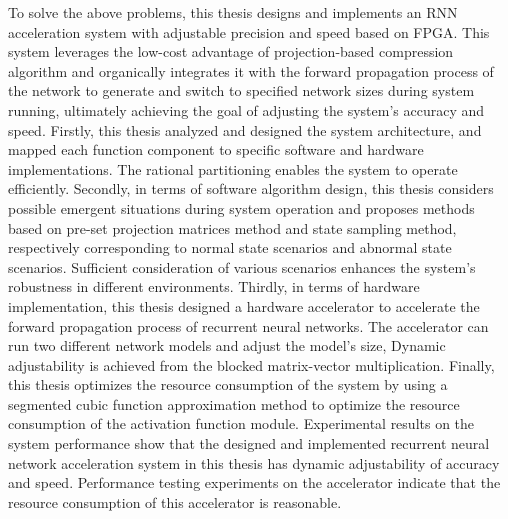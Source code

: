 \begin{englishabstract}
To solve the above problems, this thesis designs and implements an RNN acceleration system with adjustable precision and 
speed based on FPGA. 
This system leverages the low-cost advantage of projection-based compression algorithm and organically integrates it with 
the forward propagation process of the network to generate and switch to specified network sizes during system running,
ultimately achieving the goal of adjusting the system's accuracy and speed. 
Firstly, this thesis analyzed and designed the system architecture, and mapped each function component to specific software 
and hardware implementations. The rational partitioning enables the system to operate efficiently.
Secondly, in terms of software algorithm design, this thesis considers possible emergent situations during system operation 
and proposes methods based on pre-set projection matrices method and state sampling method, respectively corresponding to 
normal state scenarios and abnormal state scenarios. 
Sufficient consideration of various scenarios enhances the system's robustness in different environments.
Thirdly, in terms of hardware implementation, this thesis designed a hardware accelerator to accelerate the forward propagation 
process of recurrent neural networks. The accelerator can run two different network models and adjust the model's size, 
Dynamic adjustability is achieved from the blocked matrix-vector multiplication.
Finally, this thesis optimizes the resource consumption of the system by using a segmented cubic function approximation method to 
optimize the resource consumption of the activation function module.
Experimental results on the system performance show that the designed and implemented recurrent neural network acceleration system 
in this thesis has dynamic adjustability of accuracy and speed. Performance testing experiments on the accelerator indicate that
the resource consumption of this accelerator is reasonable.

\end{englishabstract}

